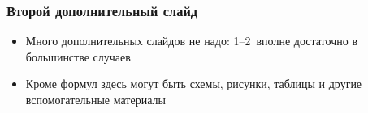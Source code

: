 \documentclass
  [ russian
  , aspectratio=1610 %
  ] {beamer}
\begin{document}
\begin{frame}
  \frametitle{Второй дополнительный слайд}
  \begin{itemize}
    \item Много дополнительных слайдов не надо: 1--2~вполне достаточно в большинстве случаев
    \item Кроме формул здесь могут быть схемы, рисунки, таблицы и другие вспомогательные материалы
  \end{itemize}

\end{frame}
\end{document}
